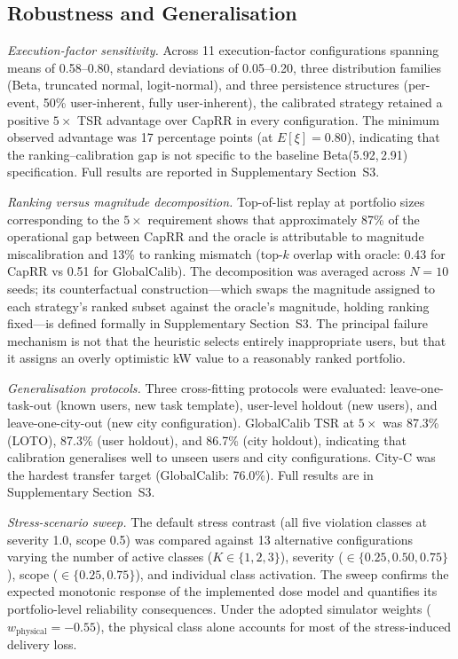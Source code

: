 \documentclass[utf8]{FrontiersinHarvard}
\begin{document}
\subsection{Robustness and Generalisation}
\label{subsec:robustness}

\textit{Execution-factor sensitivity.}
Across 11 execution-factor configurations spanning means of
0.58--0.80, standard deviations of 0.05--0.20, three
distribution families (Beta, truncated normal, logit-normal),
and three persistence structures (per-event, 50\% user-inherent,
fully user-inherent), the calibrated strategy retained a
positive $5\times$ TSR advantage over CapRR in every
configuration. The minimum observed advantage was 17
percentage points (at $E[\xi]=0.80$), indicating that the
ranking--calibration gap is not specific to the baseline
Beta(5.92,\,2.91) specification. Full results are reported
in Supplementary Section~S3.

\textit{Ranking versus magnitude decomposition.}
Top-of-list replay at portfolio sizes corresponding to the
$5\times$ requirement shows that approximately 87\% of the
operational gap between CapRR and the oracle is attributable
to magnitude miscalibration and 13\% to ranking mismatch
(top-$k$ overlap with oracle: 0.43 for CapRR vs 0.51 for
GlobalCalib). The decomposition was averaged across $N=10$
seeds; its counterfactual construction---which swaps the
magnitude assigned to each strategy's ranked subset against
the oracle's magnitude, holding ranking fixed---is defined
formally in Supplementary Section~S3.
The principal failure mechanism is not that
the heuristic selects entirely inappropriate users, but that
it assigns an overly optimistic kW value to a reasonably
ranked portfolio.

\textit{Generalisation protocols.}
Three cross-fitting protocols were evaluated:
leave-one-task-out (known users, new task template),
user-level holdout (new users), and leave-one-city-out
(new city configuration). GlobalCalib TSR at $5\times$
was 87.3\% (LOTO), 87.3\% (user holdout), and 86.7\%
(city holdout), indicating that calibration generalises
well to unseen users and city configurations. City-C
was the hardest transfer target (GlobalCalib: 76.0\%).
Full results are in Supplementary Section~S3.

\textit{Stress-scenario sweep.}
The default stress contrast (all five violation classes at
severity 1.0, scope 0.5) was compared against 13 alternative
configurations varying the number of active classes
($K \in \{1,2,3\}$), severity ($\in \{0.25,0.50,0.75\}$),
scope ($\in \{0.25,0.75\}$), and individual class activation.
The sweep confirms the expected monotonic response of the
implemented dose model and quantifies its portfolio-level
reliability consequences. Under the adopted simulator weights
($w_{\mathrm{physical}} = -0.55$), the physical class alone
accounts for most of the stress-induced delivery loss.
\end{document}
